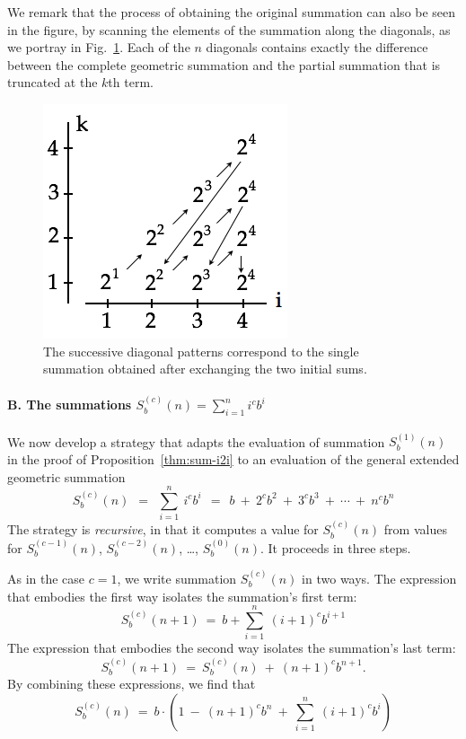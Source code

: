 We remark that the process of obtaining the original summation can
also be seen in the figure, by scanning the elements of the summation
along the diagonals, as we portray in Fig.~\ref{fig:Sumi2iDiag}.  Each
of the $n$ diagonals contains exactly the difference between the
complete geometric summation and the partial summation that is
truncated at the $k$th term.
\begin{figure}[htb]
\centerline{
\includegraphics[scale=0.4]{FiguresMaths/Sumi2iDiag}
}
\caption{The successive diagonal patterns correspond to the single summation obtained after exchanging the two initial sums.}
\label{fig:Sumi2iDiag}
\end{figure}

\smallskip

\paragraph{B. The summations $S^{(c)}_b(n) =  \sum_{i=1}^n i^c b^i$}

We now develop a strategy that adapts the evaluation of summation
$S_b^{(1)}(n)$ in the proof of Proposition~\ref{thm:sum-i2i} to an
evaluation of the general extended geometric summation
\[
S_b^{(c)}(n) \ \ = \ \ \sum_{i=1}^n \ i^c b^i
 \ \ = \ \
b \ + \ 2^{c} b^2\ + \ 3^{c} b^3 \ + \ \cdots \ + \ n^{c} b^{n}
\]
The strategy is {\em recursive}, in that it computes a value for
$S^{(c)}_b(n)$ from values for $S^{(c-1)}_b(n)$, $S^{(c-2)}_b(n)$,
\ldots, $S^{(0)}_b(n)$.  It proceeds in three steps.

%
As in the case $c=1$, we write summation $S_b^{(c)}(n)$ in two ways.
The expression that embodies the first way isolates the summation's
first term:
\[ S_b^{(c)}(n+1) \ = \ b + \sum_{i=1}^n \ (i+1)^c b^{i+1} \]
The expression that embodies the second way isolates the summation's
last term:
\[ S_b^{(c)}(n+1) \ = \ S_b^{(c)}(n) \ + \ (n+1)^{c} b^{n+1}. \]
By combining these expressions, we find that
\begin{equation}
\label{eq:Sbcn-1}
S_b^{(c)}(n) 
 \ = \
b \cdot \left(
1 \ - \
(n+1)^{c} b^{n} \ + \
 \sum_{i=1}^n \ (i+1)^c b^{i} 
\right)
\end{equation}


